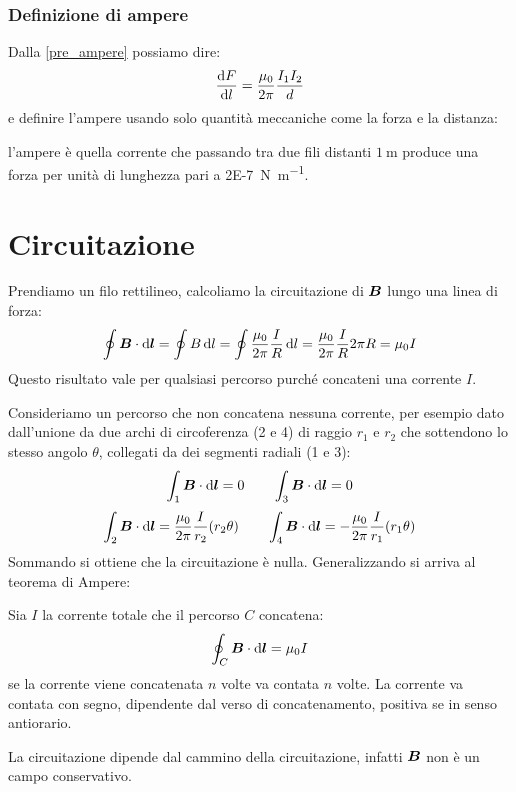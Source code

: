 \subsubsection{Definizione di ampere}
Dalla \eqref{pre_ampere} possiamo dire:
\begin{equation}
  \frac{\mathrm{d} F}{\mathrm{d} l}=\frac{\mu_0}{2\pi}\frac{I_1I_2}{d}
\end{equation}
e definire l'ampere usando solo quantità meccaniche come la forza e la distanza:
\begin{Def}[ampere]
  \label{def:ampere}
  l'ampere è quella corrente che passando tra due fili distanti $\SI{1}{\meter}$ produce una forza per unità di lunghezza pari a \SI{2E-7}{\newton\per\meter}.
\end{Def}

\section{Circuitazione}
Prendiamo un filo rettilineo, calcoliamo la circuitazione di $\boldsymbol{B}$ lungo una linea di forza:
\[\oint\boldsymbol{B}\cdot\mathrm{d}\boldsymbol{l}=\oint B\,\mathrm{d} l=\oint\frac{\mu_0}{2\pi}\frac{I}{R}\,\mathrm{d} l=\frac{\mu_0}{2\pi}\frac{I}{R}2\pi R=\mu_0 I\]
Questo risultato vale per qualsiasi percorso purché concateni una corrente $I$.

Consideriamo un percorso che non concatena nessuna corrente, per esempio dato dall'unione da due archi di circoferenza (2 e 4) di raggio $r_1$ e $r_2$ che sottendono lo stesso angolo $\theta$, collegati da dei segmenti radiali (1 e 3):
\[\int_1\boldsymbol{B}\cdot\mathrm{d} \boldsymbol{l}=0\qquad\int_3\boldsymbol{B}\cdot\mathrm{d} \boldsymbol{l}=0\]
\[\int_2\boldsymbol{B}\cdot\mathrm{d} \boldsymbol{l}=\frac{\mu_0}{2\pi}\frac{I}{r_2}(r_2\theta)\qquad
  \int_4\boldsymbol{B}\cdot\mathrm{d} \boldsymbol{l}=-\frac{\mu_0}{2\pi}\frac{I}{r_1}(r_1\theta)\]
Sommando si ottiene che la circuitazione è nulla. Generalizzando si arriva al teorema di Ampere:
\begin{Teo}
  Sia $I$ la corrente totale che il percorso $C$ concatena:
  \begin{equation}
    \oint_C \boldsymbol{B}\cdot\mathrm{d} \boldsymbol{l}=\mu_0I
    \label{circ_ampere}
  \end{equation}
  se la corrente viene concatenata $n$ volte va contata $n$ volte. La corrente va contata con segno, dipendente dal verso di concatenamento, positiva se in senso antiorario.
\end{Teo}
La circuitazione dipende dal cammino della circuitazione, infatti $\boldsymbol{B}$ non è un campo conservativo.
